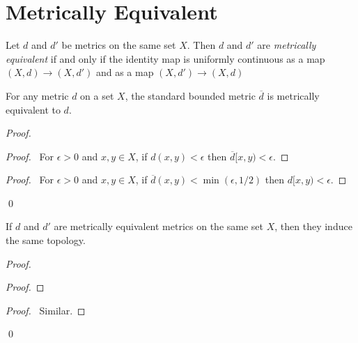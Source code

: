 \section{Metrically Equivalent}

\begin{definition}
    Let $d$ and $d'$ be metrics on the same set $X$. Then $d$ and $d'$ are \emph{metrically equivalent} if and only if the identity map
    is uniformly continuous as a map $(X,d) \rightarrow (X,d')$ and as a map $(X,d') \rightarrow (X,d)$
\end{definition}

\begin{proposition}
    For any metric $d$ on a set $X$, the standard bounded metric $\overline{d}$ is metrically equivalent to $d$.
\end{proposition}

\begin{proof}
    \pf
    \begin{proof}
        \pf\ For $\epsilon > 0$ and $x,y \in X$, if $d(x,y) < \epsilon$ then $\overline{d}[x,y) < \epsilon$.
    \end{proof}
    \begin{proof}
        \pf\ For $\epsilon > 0$ and $x,y \in X$, if $\overline{d}(x,y) < \min(\epsilon,1/2)$ then $d[x,y) < \epsilon$.
    \end{proof}
    \qed
\end{proof}

\begin{proposition}
    If $d$ and $d'$ are metrically equivalent metrics on the same set $X$, then they induce the same topology.
\end{proposition}

\begin{proof}
    \pf
    \begin{proof}
    \end{proof}
    \begin{proof}
        \pf\ Similar.
    \end{proof}
    \qed
\end{proof}


